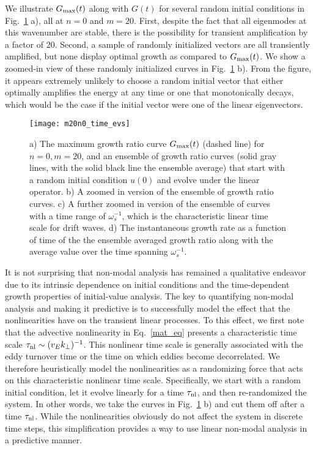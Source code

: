 \documentclass[showpacs,preprintnumbers,amsmath,amssymb,superscriptaddress,aip]{revtex4-1}
\begin{document}
We illustrate $G_{\rm{max}}(t)$ along with $G(t)$ for several random initial conditions in Fig.~\ref{m20n0_time_evs} a), all at $n=0$ and $m=20$. First, despite the fact that all eigenmodes at this
wavenumber are stable, there is the possibility for transient amplification by a factor of $20$. Second, a sample of randomly initialized vectors are all transiently amplified, but none display
optimal growth as compared to $G_{\rm{max}}(t)$. We show a zoomed-in view of these randomly initialized curves in Fig.~\ref{m20n0_time_evs} b).
From the figure, it appears extremely unlikely to choose a random initial vector that either optimally amplifies the energy at any time or one that monotonically decays, which would be the case
if the initial vector were one of the linear eigenvectors. 

\begin{figure}
\centerline{\texttt{[image: m20n0\_time\_evs]}}
\caption{a) The maximum growth ratio curve $G_{\rm{max}}(t)$ (dashed line) for $n=0,m=20$, and an ensemble of growth ratio curves (solid gray lines, with the solid black line the ensemble average)
that start with a random initial condition $u(0)$ and evolve under the linear operator. b) A zoomed in version of the ensemble of growth ratio curves. c) A further zoomed in version of the ensemble of
curves with a time range of $\omega_s^{-1}$, which is the characteristic linear time scale for drift waves. 
d) The instantaneous growth rate as a function of time of the the ensemble averaged growth ratio along with the average value over the time spanning $\omega_s^{-1}$.}
\label{m20n0_time_evs}
\end{figure}

It is not surprising that non-modal analysis has remained a qualitative endeavor due to its intrinsic dependence on initial conditions and the time-dependent growth properties of initial-value analysis.
The key to quantifying non-modal analysis and making it predictive is to successfully model the effect that the nonlinearities have on the transient linear processes. 
To this effect, we first note that the advective nonlinearity in Eq.~\ref{mat_eq} presents a characteristic time scale $\tau_{\rm{nl}} \sim (v_E k_\perp)^{-1}$. This nonlinear
time scale is generally associated with the eddy turnover time or the time on which eddies become decorrelated. We therefore heuristically model the nonlinearities 
as a randomizing force that acts on this characteristic nonlinear time scale.
Specifically, we start with a random initial condition, let it evolve linearly for a time $\tau_{\rm{nl}}$, and then re-randomized the system.
In other words, we take the curves in Fig.~\ref{m20n0_time_evs} b) and cut them off after a time $\tau_{\rm{nl}}$.
While the nonlinearities obviously do not affect the system in discrete time steps, this simplification provides a way to use linear non-modal analysis in a predictive manner.
\end{document}
